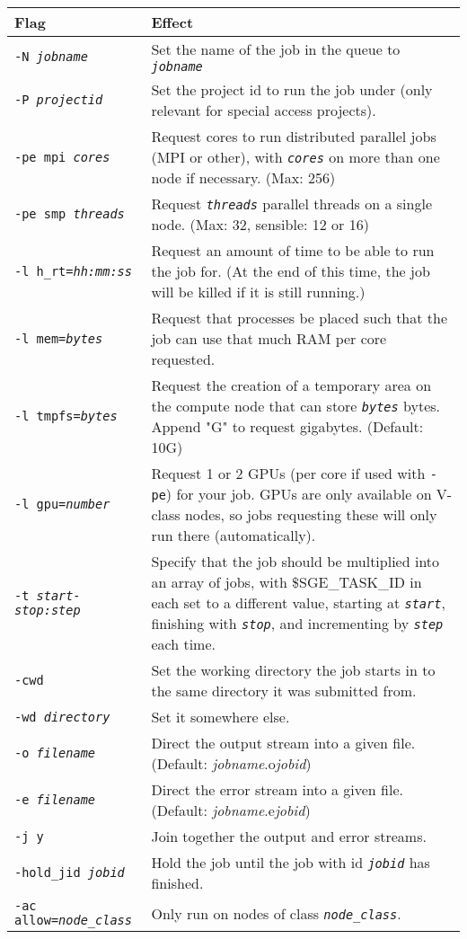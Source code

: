 \documentclass[landscape,a4paper]{article}
\renewcommand{\th}[1]{\textbf{#1}}
\newcommand{\code}[1]{\texttt{#1}}
\newcommand{\codeit}[1]{\texttt{\color{SchemeColour}\emph{#1}}}
\begin{document}
\begin{multicols}{3}
{\small \centering
\begin{tabular}{p{2.5cm}p{5cm}}
\hline
\th{Flag} & \th{Effect}\\
\hline
\code{-N }\codeit{jobname} &
Set the name of the job in the queue to \codeit{jobname}
\\
\code{-P }\codeit{projectid} &
Set the project id to run the job under (only relevant for special access projects).
\\
\code{-pe mpi }\codeit{cores} & 
Request cores to run distributed parallel jobs (MPI or other), with \codeit{cores} on more than one node if necessary. (Max: 256)
\\
\code{-pe smp }\codeit{threads} &
Request \codeit{threads} parallel threads on a single node. (Max: 32, sensible: 12 or 16)
\\
\code{-l h\_rt=}\codeit{hh:mm:ss} & 
Request an amount of time to be able to run the job for. (At the end of this time, the job will be killed if it is still running.)
\\
\code{-l mem=}\codeit{bytes} & 
Request that processes be placed such that the job can use that much RAM per core requested.
\\
\code{-l tmpfs=}\codeit{bytes} & 
Request the creation of a temporary area on the compute node that can store \codeit{bytes} bytes. Append "G" to request gigabytes. (Default: 10G)
\\
\code{-l gpu=}\codeit{number} &
Request 1 or 2 GPUs (per core if used with \code{-pe}) for your job. GPUs are only available on V-class nodes, so jobs requesting these will only run there (automatically).
\\ 
\code{-t }\codeit{start-stop:step} & 
Specify that the job should be multiplied into an array of jobs, with \$SGE\_TASK\_ID in each set to a different value, starting at \codeit{start}, finishing with \codeit{stop}, and incrementing by \codeit{step} each time.
\\
\code{-cwd} & 
Set the working directory the job starts in to the same directory it was submitted from.
\\
\code{-wd }\codeit{directory} & 
Set it somewhere else.
\\
\code{-o }\codeit{filename} & 
Direct the output stream into a given file. (Default: \textit{jobname}.o\textit{jobid})
\\
\code{-e }\codeit{filename} & 
Direct the error stream into a given file. (Default: \textit{jobname}.e\textit{jobid})
\\
\code{-j y} & 
Join together the output and error streams.
\\
\code{-hold\_jid }\codeit{jobid} & 
Hold the job until the job with id \codeit{jobid} has finished.
\\
\code{-ac allow=}\codeit{node\_class} & 
Only run on nodes of class \codeit{node\_class}.
\\
\hline
\end{tabular}
}



\end{multicols}
\end{document}
